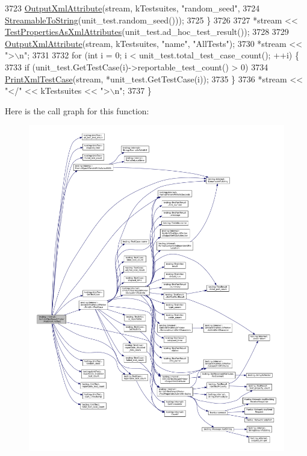 \begin{DoxyCode}
3723     \hyperlink{classtesting_1_1internal_1_1XmlUnitTestResultPrinter_aa8ca7066de948d26d171597430c75839}{OutputXmlAttribute}(stream, kTestsuites, \textcolor{stringliteral}{"random\_seed"},
3724                        \hyperlink{namespacetesting_1_1internal_aad4beed95d0846e6ffc5da0978ef3bb9}{StreamableToString}(unit\_test.random\_seed()));
3725   \}
3726 
3727   *stream << \hyperlink{classtesting_1_1internal_1_1XmlUnitTestResultPrinter_aaac4f1352a2cc46f6a69994d45999f0b}{TestPropertiesAsXmlAttributes}(unit\_test.ad\_hoc\_test\_result());
3728 
3729   \hyperlink{classtesting_1_1internal_1_1XmlUnitTestResultPrinter_aa8ca7066de948d26d171597430c75839}{OutputXmlAttribute}(stream, kTestsuites, \textcolor{stringliteral}{"name"}, \textcolor{stringliteral}{"AllTests"});
3730   *stream << \textcolor{stringliteral}{">\(\backslash\)n"};
3731 
3732   \textcolor{keywordflow}{for} (\textcolor{keywordtype}{int} i = 0; i < unit\_test.total\_test\_case\_count(); ++i) \{
3733     \textcolor{keywordflow}{if} (unit\_test.GetTestCase(i)->reportable\_test\_count() > 0)
3734       \hyperlink{classtesting_1_1internal_1_1XmlUnitTestResultPrinter_a7f7accabeac896d4271f36d24ca02dba}{PrintXmlTestCase}(stream, *unit\_test.GetTestCase(i));
3735   \}
3736   *stream << \textcolor{stringliteral}{"</"} << kTestsuites << \textcolor{stringliteral}{">\(\backslash\)n"};
3737 \}
\end{DoxyCode}
Here is the call graph for this function\+:
\nopagebreak
\begin{figure}[H]
\begin{center}
\leavevmode
\includegraphics[width=350pt]{classtesting_1_1internal_1_1XmlUnitTestResultPrinter_a3be1c8766241d0f34cdf59b45a52f73b_cgraph}
\end{center}
\end{figure}
